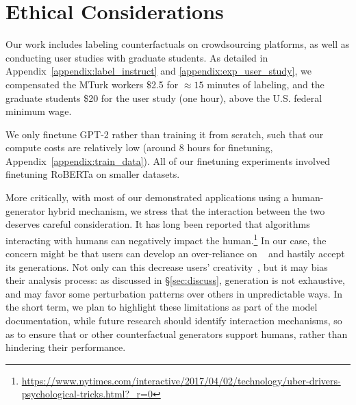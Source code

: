 
\section{Ethical Considerations}
Our work includes labeling counterfactuals on crowdsourcing platforms, as well as conducting user studies with graduate students.
As detailed in Appendix~\ref{appendix:label_instruct} and \ref{appendix:exp_user_study}, we compensated the MTurk workers \$2.5 for ${\approx}15$ minutes of labeling, and the graduate students \$20 for the user study (one hour), above the U.S. federal minimum wage.

We only finetune GPT-2 rather than training it from scratch, such that our compute costs are relatively low (around 8 hours for finetuning, Appendix~\ref{appendix:train_data}). All of our finetuning experiments involved finetuning RoBERTa on smaller datasets.

More critically, with most of our demonstrated applications using a human-generator hybrid mechanism, we stress that the interaction between the two deserves careful consideration.
It has long been reported that algorithms interacting with humans can negatively impact the human.\footnote{\url{https://www.nytimes.com/interactive/2017/04/02/technology/uber-drivers-psychological-tricks.html?_r=0}}
In our case, the concern might be that users can develop an over-reliance on \sysname~\cite{bansal2021does} and hastily accept its generations.
Not only can this decrease users' creativity~\cite{green-etal-2014-human}, but it may bias their analysis process: as discussed in \S\ref{sec:discuss}, \sysname generation is not exhaustive, and may favor some perturbation patterns over others in unpredictable ways.
In the short term, we plan to highlight these limitations as part of the model documentation, while future research should identify interaction mechanisms, so as to ensure that \sysname or other counterfactual generators support humans, rather than hindering their performance.



